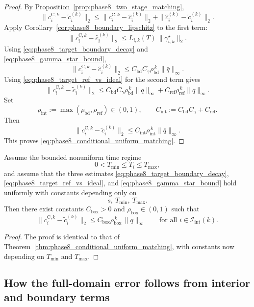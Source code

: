 \begin{proof}
By Proposition~\ref{prop:phase8_two_stage_matching},
\[
\|c_i^{\mathrm{C},k}-\tilde c_i^{(k)}\|_2
\le
\|c_i^{\mathrm{C},k}-\hat c_i^{(k)}\|_2
+
\|\hat c_i^{(k)}-\tilde c_i^{(k)}\|_2.
\]
Apply Corollary~\ref{cor:phase8_boundary_lipschitz} to the first term:
\[
\|c_i^{\mathrm{C},k}-\hat c_i^{(k)}\|_2
\le
L_{i,k}(T)\,\|\gamma_{i,k}^{\star}\|_2.
\]
Using \eqref{eq:phase8_target_boundary_decay} and \eqref{eq:phase8_gamma_star_bound},
\[
\|c_i^{\mathrm{C},k}-\hat c_i^{(k)}\|_2
\le
C_{\mathrm{bd}}C_{\gamma}\rho_{\mathrm{bd}}^{\,k}\|\bar q\|_\infty.
\]
Using \eqref{eq:phase8_target_ref_vs_ideal} for the second term gives
\[
\|c_i^{\mathrm{C},k}-\tilde c_i^{(k)}\|_2
\le
C_{\mathrm{bd}}C_{\gamma}\rho_{\mathrm{bd}}^{\,k}\|\bar q\|_\infty
+
C_{\mathrm{ref}}\rho_{\mathrm{ref}}^{\,k}\|\bar q\|_\infty.
\]
Set
\[
\rho_{\mathrm{int}}:=\max(\rho_{\mathrm{bd}},\rho_{\mathrm{ref}})\in(0,1),
\qquad
C_{\mathrm{int}}:=C_{\mathrm{bd}}C_{\gamma}+C_{\mathrm{ref}}.
\]
Then
\[
\|c_i^{\mathrm{C},k}-\tilde c_i^{(k)}\|_2
\le
C_{\mathrm{int}}\rho_{\mathrm{int}}^{\,k}\|\bar q\|_\infty.
\]
This proves \eqref{eq:phase8_conditional_uniform_matching}.
\end{proof}

\begin{theorem}
\label{thm:phase8_conditional_box_matching}
Assume the bounded nonuniform time regime
\[
0<T_{\min}\le T_i\le T_{\max},
\]
and assume that the three estimates
\eqref{eq:phase8_target_boundary_decay},
\eqref{eq:phase8_target_ref_vs_ideal},
and \eqref{eq:phase8_gamma_star_bound}
hold uniformly with constants depending only on
\[
s,\ T_{\min},\ T_{\max}.
\]
Then there exist constants \(C_{\mathrm{box}}>0\) and \(\rho_{\mathrm{box}}\in(0,1)\) such that
\begin{equation}
\label{eq:phase8_conditional_box_matching}
\|c_i^{\mathrm{C},k}-\tilde c_i^{(k)}\|_2
\le
C_{\mathrm{box}}\rho_{\mathrm{box}}^{\,k}\,\|\bar q\|_\infty
\qquad
\text{for all } i\in\mathcal I_{\mathrm{int}}(k).
\end{equation}
\end{theorem}

\begin{proof}
The proof is identical to that of Theorem~\ref{thm:phase8_conditional_uniform_matching}, with constants now depending on \(T_{\min}\) and \(T_{\max}\).
\end{proof}

\subsection{How the full-domain error follows from interior and boundary terms}
\label{subsec:phase8_full_from_interior_boundary}

